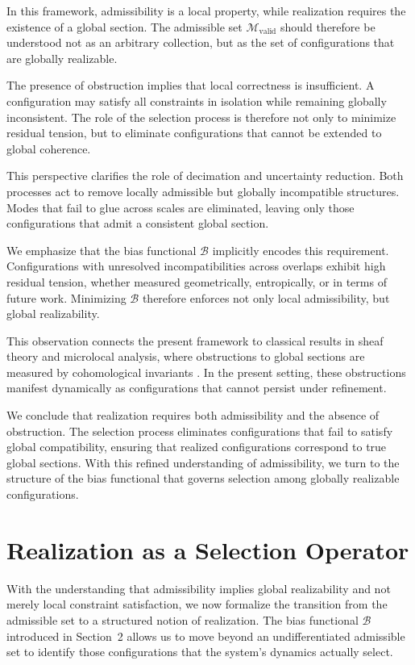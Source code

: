 \documentclass[11pt]{article}
\theoremstyle{plain}
\theoremstyle{definition}
\theoremstyle{remark}
\begin{document}
In this framework, admissibility is a local property, while realization requires the existence of a global section. The admissible set $\mathcal{M}_{\mathrm{valid}}$ should therefore be understood not as an arbitrary collection, but as the set of configurations that are globally realizable.

The presence of obstruction implies that local correctness is insufficient. A configuration may satisfy all constraints in isolation while remaining globally inconsistent. The role of the selection process is therefore not only to minimize residual tension, but to eliminate configurations that cannot be extended to global coherence.

This perspective clarifies the role of decimation and uncertainty reduction. Both processes act to remove locally admissible but globally incompatible structures. Modes that fail to glue across scales are eliminated, leaving only those configurations that admit a consistent global section.

We emphasize that the bias functional $\mathcal{B}$ implicitly encodes this requirement. Configurations with unresolved incompatibilities across overlaps exhibit high residual tension, whether measured geometrically, entropically, or in terms of future work. Minimizing $\mathcal{B}$ therefore enforces not only local admissibility, but global realizability.

This observation connects the present framework to classical results in sheaf theory and microlocal analysis, where obstructions to global sections are measured by cohomological invariants \cite{Bredon1997, KashiwaraSchapira1990}. In the present setting, these obstructions manifest dynamically as configurations that cannot persist under refinement.

We conclude that realization requires both admissibility and the absence of obstruction. The selection process eliminates configurations that fail to satisfy global compatibility, ensuring that realized configurations correspond to true global sections. With this refined understanding of admissibility, we turn to the structure of the bias functional that governs selection among globally realizable configurations.

\section{Realization as a Selection Operator}

With the understanding that admissibility implies global realizability and not merely local constraint satisfaction, we now formalize the transition from the admissible set to a structured notion of realization. The bias functional $\mathcal{B}$ introduced in Section~2 allows us to move beyond an undifferentiated admissible set to identify those configurations that the system's dynamics actually select.
\end{document}
